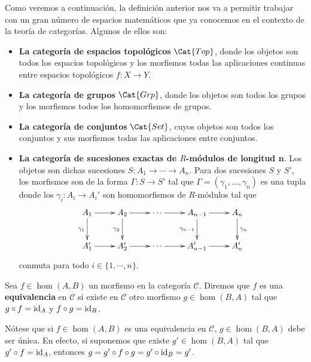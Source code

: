 \begin{ejemplo}
	Como veremos a continuación, la definición anterior nos va a permitir trabajar
	con un gran número de espacios matemáticos que ya conocemos en el contexto de
	la teoría de categorías. Algunos de ellos son:
	\begin{itemize}
		\item \textbf{La categoría de espacios topológicos} $\Cat{Top}$, donde los objetos son todos
			los espacios topológicos y los morfismos todas las aplicaciones continuas entre
			espacios topológicos \(f: X \rightarrow Y\).
		\item \textbf{La categoría de grupos}  $\Cat{Grp}$, donde los objetos son todos los grupos
			y los morfismos todos los homomorfismos de grupos.
		\item \textbf{La categoría de conjuntos}  $\Cat{Set}$, cuyos objetos son todos los conjuntos
			y sus morfismos todas las aplicaciones entre conjuntos.
		\item \textbf{La categoría de sucesiones exactas de \(R\)-módulos de longitud
			n}. Los objetos son dichas sucesiones \(S: A_{1} \rightarrow \cdots \rightarrow
			A_{n}\). Para dos sucesiones \(S\) y \(S'\), los morfismos son de la forma \(\Gamma
			: S \rightarrow S'\) tal que \(\Gamma = (\gamma_{1}, \ldots, \gamma_{n})\) es una
			tupla donde los \(\gamma_{i}: A_{i} \rightarrow A_{i}'\) son homomorfismos de
			\(R\)-módulos tal que
			\begin{equation}
				\label{exactseqcat}\xymatrix{ A_1 \ar[r] \ar[d]_{\gamma_1} & A_2 \ar[r] \ar[d]_{\gamma_2} & \cdots \ar[r] & A_{n-1} \ar[r] \ar[d]_{\gamma_{n-1}} & A_n \ar[d]^{\gamma_n} \\ A'_1 \ar[r] & A'_2 \ar[r] & \cdots \ar[r] & A'_{n-1} \ar[r] & A'_n }
			\end{equation}
			conmuta para todo \(i \in \{ 1, \cdots, n \}\).
	\end{itemize}
\end{ejemplo}

\begin{definicion}
	Sea \(f \in \hom(A,B)\) un morfismo en la categoría \(\mathcal{C}\). Diremos que
	\(f\) es una \textbf{equivalencia} en \(\mathcal{C}\) si existe en \(\mathcal{C}\) otro
	morfismo \(g \in \hom(B,A)\) tal que \(g \circ f = \operatorname{id}_{A}\) y \(f \circ g = \operatorname{id}_{B}\).
\end{definicion}

Nótese que si \(f \in \hom(A,B)\) es una equivalencia en \(\mathcal{C}\),
\(g \in \hom(B,A)\) debe ser única. En efecto, si suponemos que existe
\(g' \in \hom(B,A)\) tal que \(g' \circ f = \operatorname{id}_{A}\), entonces \(g = g'\circ f \circ
g = g' \circ \operatorname{id}_{B} = g'\).

